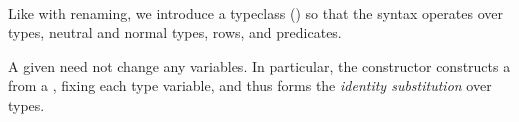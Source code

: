 \documentclass[sigplan,screen]{acmart}
\begin{document}
\begin{AgdaAlign}
\begin{code}
\AgdaSymbol{:}\AgdaSpace{}%
\AgdaSpace{}%
\AgdaSpace{}%
\AgdaSpace{}%
\AgdaSpace{}%
\AgdaSpace{}%
\AgdaSpace{}%
\AgdaSpace{}%
\AgdaSpace{}%
\AgdaSpace{}%
\AgdaSpace{}%
\<%
\end{code}
\begin{code}[hide]%
%
\>[2]\AgdaSpace{}%
\AgdaSpace{}%
\AgdaSpace{}%
\<%
\\
%
\>[2]\AgdaSpace{}%
\AgdaOperator{\AgdaFunction{[}}\AgdaSpace{}%
\AgdaSpace{}%
\AgdaOperator{\AgdaFunction{]ₛ}}\AgdaSpace{}%
\AgdaSymbol{=}\AgdaSpace{}%
\AgdaSpace{}%
\AgdaSpace{}%
\<%
\end{code}
\end{AgdaAlign}

Like with renaming, we introduce a typeclass () so that the syntax  operates over types, neutral and normal types, rows, and predicates.

A given  need not change any variables. In particular, the  constructor  constructs a  from a , fixing each type variable, and thus forms the \emph{identity substitution} over types.
\end{document}
